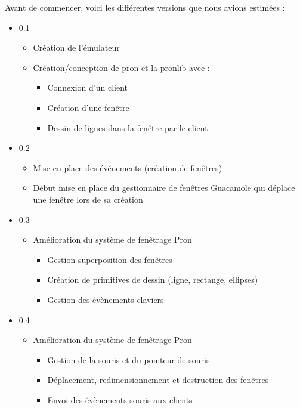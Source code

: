 Avant de commencer, voici les différentes versions que nous avions estimées :

\begin{itemize}
  \item 0.1
    \begin{itemize}
      \item Création de l'émulateur
      \item Création/conception de pron et la pronlib avec :
        \begin{itemize}
          \item Connexion d'un client
          \item Création d'une fenêtre
          \item Dessin de lignes dans la fenêtre par le client
        \end{itemize}
  \end{itemize}
  \item 0.2
    \begin{itemize}
      \item Mise en place des événements (création de fenêtres)
      \item Début mise en place du gestionnaire de fenêtres Guacamole qui déplace une fenêtre lors de sa création
  \end{itemize}
  \item 0.3
    \begin{itemize}
      \item Amélioration du système de fenêtrage Pron
        \begin{itemize}
          \item Gestion superposition des fenêtres
          \item Création de primitives de dessin (ligne, rectange, ellipses)
          \item Gestion des évènements claviers
      \end{itemize}
  \end{itemize}
  \item 0.4
    \begin{itemize}
      \item Amélioration du système de fenêtrage Pron
        \begin{itemize}
          \item Gestion de la souris et du pointeur de souris
          \item Déplacement, redimensionnement et destruction des fenêtres
          \item Envoi des évènements souris aux clients
      \end{itemize}

\end{itemize}
\end{itemize}
